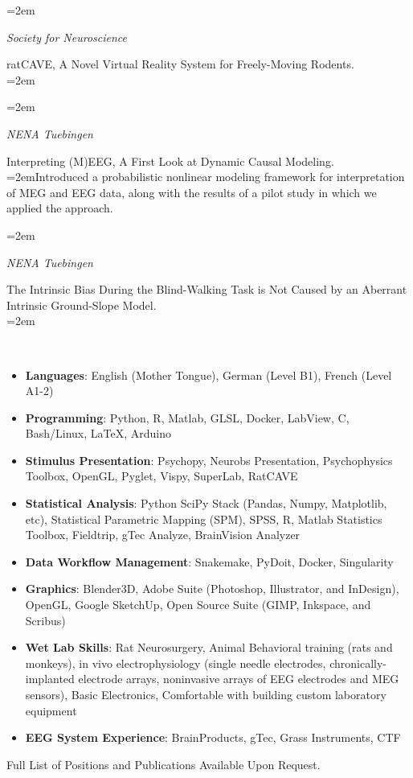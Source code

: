 \documentclass{article}%
\newlength{\datebox}%
\newcommand{\SubHeading}[1]{\vspace{1em}\noindent\spacedlowsmallcaps{#1}\vspace{0.7em}\\}%
\newcommand{\MarginText}[1]{\marginpar{\raggedleft\small#1}}%
\newcommand{\Description}[1]{\hangindent=2em\hangafter=0\footnotesize{#1}\par\normalsize\vspace{1em}}%
\newcommand{\EntryHeader}[3]{\noindent\hangindent=2em\hangafter=0 \parbox{\datebox}{\small \textit{#2}}\hspace{1.5em} \MarginText{#1} #3 \vspace{0.5em}}%
\newcommand{\NewEntry}[4]{\EntryHeader{#1}{#2}{#3}\\\Description{#4}}%
\begin{document}
\begin{cv}{}
\NewEntry{Nov 2014}{Society for Neuroscience}{ratCAVE, A Novel Virtual Reality System for Freely{-}Moving Rodents.}{}%
\NewEntry{Nov. 2012}{NENA Tuebingen}{Interpreting (M)EEG, A First Look at Dynamic Causal Modeling.}{Introduced a probabilistic nonlinear modeling framework for interpretation of MEG and EEG data, along with the results of a pilot study in which we applied the approach.}%
\NewEntry{Nov. 2011}{NENA Tuebingen}{The Intrinsic Bias During the Blind{-}Walking Task is Not Caused by an Aberrant Intrinsic Ground{-}Slope Model.}{}%
\SubHeading{Skills}%
\begin{itemize}%
\item%
\textbf{Languages}: English (Mother Tongue), German (Level B1), French (Level A1-2)%
\end{itemize}%
\begin{itemize}%
\item%
\textbf{Programming}: Python, R, Matlab, GLSL, Docker, LabView, C, Bash/Linux, LaTeX, Arduino%
\end{itemize}%
\begin{itemize}%
\item%
\textbf{Stimulus Presentation}: Psychopy, Neurobs Presentation, Psychophysics Toolbox, OpenGL, Pyglet, Vispy, SuperLab, RatCAVE%
\end{itemize}%
\begin{itemize}%
\item%
\textbf{Statistical Analysis}: Python SciPy Stack (Pandas, Numpy, Matplotlib, etc), Statistical Parametric Mapping (SPM), SPSS, R, Matlab Statistics Toolbox, Fieldtrip, gTec Analyze, BrainVision Analyzer%
\end{itemize}%
\begin{itemize}%
\item%
\textbf{Data Workflow Management}: Snakemake, PyDoit, Docker, Singularity%
\end{itemize}%
\begin{itemize}%
\item%
\textbf{Graphics}: Blender3D, Adobe Suite (Photoshop, Illustrator, and InDesign), OpenGL, Google SketchUp, Open Source Suite (GIMP, Inkspace, and Scribus)%
\end{itemize}%
\begin{itemize}%
\item%
\textbf{Wet Lab Skills}: Rat Neurosurgery, Animal Behavioral training (rats and monkeys), in vivo electrophysiology (single needle electrodes, chronically-implanted electrode arrays, noninvasive arrays of EEG electrodes and MEG sensors), Basic Electronics, Comfortable with building custom laboratory equipment%
\end{itemize}%
\begin{itemize}%
\item%
\textbf{EEG System Experience}: BrainProducts, gTec, Grass Instruments, CTF%
\end{itemize}%
Full List of Positions and Publications Available Upon Request.%
\end{cv}%
\end{document}
